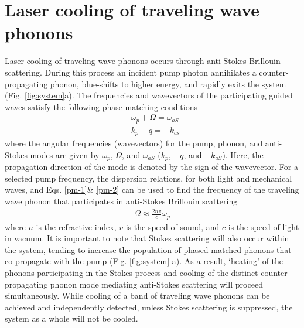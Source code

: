 \section{Laser cooling of traveling wave phonons}
Laser cooling of traveling wave phonons occurs through anti-Stokes Brillouin scattering. During this process an incident pump photon annihilates a counter-propagating phonon, blue-shifts to higher energy, and rapidly exits the system (Fig. \ref{fig:system}a).
%
The frequencies and wavevectors of the participating guided waves satisfy the following phase-matching conditions
\begin{align}
\label{pm-1}
    &\omega_p + \Omega = \omega_{aS} \\
    \label{pm-2}
    &k_p - q = -k_{as}
\end{align}
where the angular frequencies (wavevectors) for the pump, phonon, and anti-Stokes modes are given by $\omega_p$, $\Omega$, and $\omega_{aS}$ ($k_p$, $-q$, and $-k_{aS}$). Here, the propagation direction of the mode is denoted by the sign of the wavevector. For a selected pump frequency, the dispersion relations, for both light and mechanical waves, and Eqs. \eqref{pm-1}\& \eqref{pm-2} can be used to find the frequency of the traveling wave phonon that participates in anti-Stokes Brillouin scattering
\begin{align}
\label{pm-3}
    \Omega \approx \frac{2 n v}{c}\omega_p
\end{align}
where $n$ is the refractive index, $v$ is the speed of sound, and $c$ is the speed of light in vacuum. It is important to note that Stokes scattering will also occur within the system, tending to increase the population of phased-matched phonons that co-propagate with the pump (Fig. \ref{fig:system} a). As a result, `heating' of the phonons participating in the Stokes process and cooling of the distinct counter-propagating phonon mode mediating anti-Stokes scattering will proceed simultaneously. While cooling of a band of traveling wave phonons can be achieved and independently detected, unless Stokes scattering is suppressed, the system as a whole will not be cooled.

